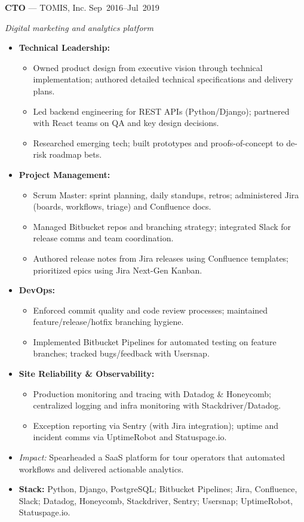 \documentclass[10pt]{article}
\begin{document}
\noindent\textbf{CTO} — TOMIS, Inc. \hfill Sep~2016--Jul~2019\par
\emph{Digital marketing and analytics platform}\par
\begin{itemize}
  \item \textbf{Technical Leadership:}
    \begin{itemize}[leftmargin=*,label=--]
      \item Owned product design from executive vision through technical implementation; authored detailed technical specifications and delivery plans.
      \item Led backend engineering for REST APIs (Python/Django); partnered with React teams on QA and key design decisions.
      \item Researched emerging tech; built prototypes and proofs-of-concept to de-risk roadmap bets.
    \end{itemize}
  \item \textbf{Project Management:}
    \begin{itemize}[leftmargin=*,label=--]
      \item Scrum Master: sprint planning, daily standups, retros; administered Jira (boards, workflows, triage) and Confluence docs.
      \item Managed Bitbucket repos and branching strategy; integrated Slack for release comms and team coordination.
      \item Authored release notes from Jira releases using Confluence templates; prioritized epics using Jira Next-Gen Kanban.
    \end{itemize}
  \item \textbf{DevOps:}
    \begin{itemize}[leftmargin=*,label=--]
      \item Enforced commit quality and code review processes; maintained feature/release/hotfix branching hygiene.
      \item Implemented Bitbucket Pipelines for automated testing on feature branches; tracked bugs/feedback with Usersnap.
    \end{itemize}
  \item \textbf{Site Reliability \& Observability:}
    \begin{itemize}[leftmargin=*,label=--]
      \item Production monitoring and tracing with Datadog \& Honeycomb; centralized logging and infra monitoring with Stackdriver/Datadog.
      \item Exception reporting via Sentry (with Jira integration); uptime and incident comms via UptimeRobot and Statuspage.io.
    \end{itemize}
  \item \textit{Impact:} Spearheaded a SaaS platform for tour operators that automated workflows and delivered actionable analytics.
  \item \textbf{Stack:} Python, Django, PostgreSQL; Bitbucket Pipelines; Jira, Confluence, Slack; Datadog, Honeycomb, Stackdriver, Sentry; Usersnap; UptimeRobot, Statuspage.io.
\end{itemize}
\end{document}
